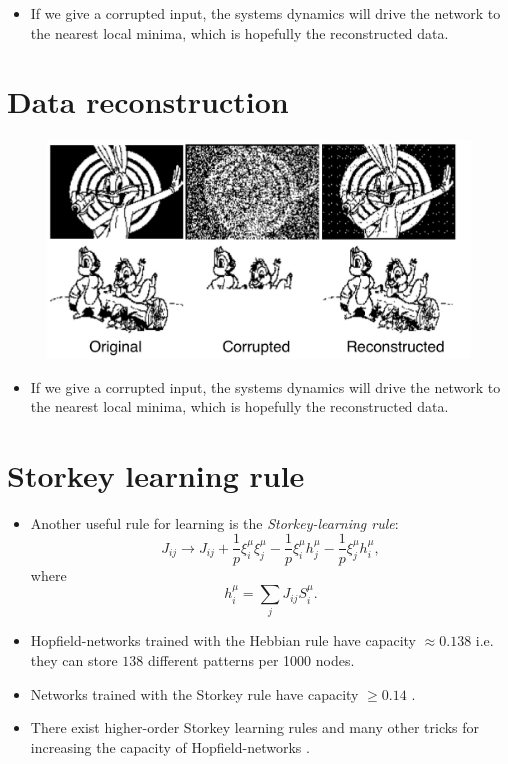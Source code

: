 \documentclass[12pt]{article}
\numberwithin{equation}{section}
\begin{document}
\begin{itemize}
    \item If we give a corrupted input, the systems dynamics will drive the network to the
    nearest local minima, which is hopefully the reconstructed data.
\end{itemize}

\newpage
\section*{Data reconstruction}
\begin{figure}[h!]
    \centering
    \includegraphics[height=0.5\textheight]{images/hopfield-reconstruction.png}
\end{figure}
\begin{itemize}
    \item If we give a corrupted input, the systems dynamics will drive the network to the
    nearest local minima, which is hopefully the reconstructed data.
\end{itemize}

\newpage
\section*{Storkey learning rule}
\begin{itemize}
    \item Another useful rule for learning is the \textit{Storkey-learning rule}:
    \begin{equation*}
        J_{ij} \rightarrow J_{ij} + \frac{1}{p}\xi_i^{\mu}\xi_j^{\mu} - \frac{1}{p}\xi^{\mu}_i h^{\mu}_j - \frac{1}{p}\xi^{\mu}_j h^{\mu}_i,
    \end{equation*}
    where
    \begin{equation*}
        h^{\mu}_i = \sum\limits_j J_{ij}S_i^{\mu}.
    \end{equation*}
    \item Hopfield-networks trained with the Hebbian rule have capacity $\approx 0.138$ i.e. they can store $138$
    different patterns per 1000 nodes.
    \item Networks trained with the Storkey rule have capacity $\geq 0.14$ \cite{Liou1999}.
    \item There exist higher-order Storkey learning rules and many other tricks for increasing the capacity of 
    Hopfield-networks \cite{aboudib:hal-01058303}.
\end{itemize}
\end{document}
